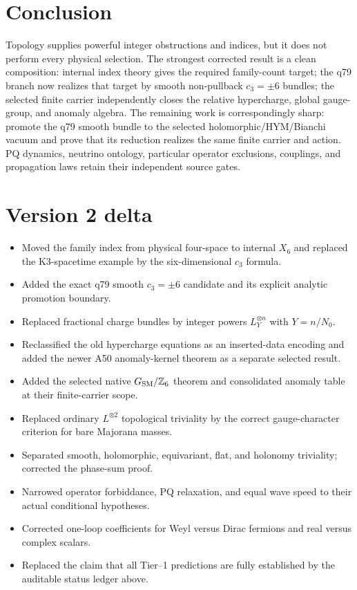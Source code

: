\documentclass[11pt]{article}
\theoremstyle{plain}
\theoremstyle{definition}
\theoremstyle{remark}
\newcommand{\Z}{\mathbb{Z}}
\begin{document}
\section{Conclusion}

Topology supplies powerful integer obstructions and indices, but it does not
perform every physical selection. The strongest corrected result is a clean
composition: internal index theory gives the required family-count target;
the q79 branch now realizes that target by smooth non-pullback
$c_3=\pm6$ bundles; the selected finite carrier independently closes the
relative hypercharge, global gauge-group, and anomaly algebra. The remaining
work is correspondingly sharp: promote the q79 smooth bundle to the selected
holomorphic/HYM/Bianchi vacuum and prove that its reduction realizes the same
finite carrier and action. PQ dynamics, neutrino ontology, particular
operator exclusions, couplings, and propagation laws retain their independent
source gates.

\section*{Version 2 delta}
\begin{itemize}[leftmargin=*]
\item Moved the family index from physical four-space to internal $X_6$ and
replaced the K3-spacetime example by the six-dimensional $c_3$ formula.
\item Added the exact q79 smooth $c_3=\pm6$ candidate and its explicit analytic
promotion boundary.
\item Replaced fractional charge bundles by integer powers
$L_Y^{\otimes n}$ with $Y=n/N_0$.
\item Reclassified the old hypercharge equations as an inserted-data encoding
and added the newer A50 anomaly-kernel theorem as a separate selected result.
\item Added the selected native $G_{\rm SM}/\Z_6$ theorem and consolidated
anomaly table at their finite-carrier scope.
\item Replaced ordinary $L^{\otimes2}$ topological triviality by the correct
gauge-character criterion for bare Majorana masses.
\item Separated smooth, holomorphic, equivariant, flat, and holonomy
triviality; corrected the phase-sum proof.
\item Narrowed operator forbiddance, PQ relaxation, and equal wave speed to
their actual conditional hypotheses.
\item Corrected one-loop coefficients for Weyl versus Dirac fermions and real
versus complex scalars.
\item Replaced the claim that all Tier--1 predictions are fully established by
the auditable status ledger above.
\end{itemize}
\end{document}

